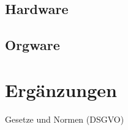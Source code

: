 \documentclass[a4paper,report,headsepline]{scrreprt}
\begin{document}
\section{Hardware}\label{hardware}

\section{Orgware}\label{orgware}


\chapter{Ergänzungen}\label{ergänzungen}
Gesetze und Normen (DSGVO)


\clearpage
{}
\listoffigures

\clearpage
{}
\listoftables

\appendix

\end{document}
